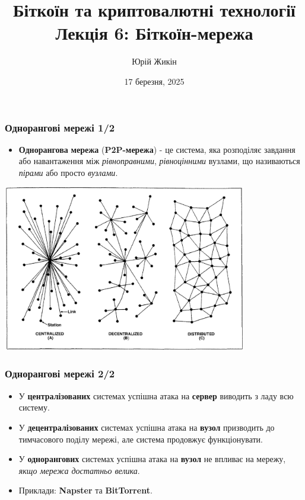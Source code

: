 \documentclass{beamer}
\title{
  Біткоїн та криптовалютні технології \\
  Лекція 6: Біткоїн-мережа
}
\author{Юрій Жикін}
\date{17 березня, 2025}
\begin{document}
\frame{\titlepage}

\begin{frame}
  \frametitle{Однорангові мережі 1/2}
  \begin{itemize}
  \item \textbf{Однорангова} \textbf{мережа} (\textbf{P2P-мережа}) - це система,
    яка розподіляє завдання або навантаження між \textit{рівноправними},
    \textit{рівноцінними} вузлами, що називаються \textit{пірами} або просто
    \textit{вузлами}.
  \end{itemize}
  \begin{center}
    \includegraphics[width=0.8\textwidth]{networks}
  \end{center}
\end{frame}

\begin{frame}
  \frametitle{Однорангові мережі 2/2}
  \begin{itemize}
  \item У \textbf{централізованих} системах успішна атака на \textbf{сервер}
    виводить з ладу всю систему.
  \item У \textbf{децентралізованих} системах успішна атака на \textbf{вузол}
    призводить до тимчасового поділу мережі, але система продовжує
    функціонувати.
  \item У \textbf{однорангових} системах успішна атака на \textbf{вузол} не
    впливає на мережу, \textit{якщо мережа достатньо велика}.
  \item Приклади: \textbf{Napster} та \textbf{BitTorrent}.
  \end{itemize}
\end{frame}
\end{document}
